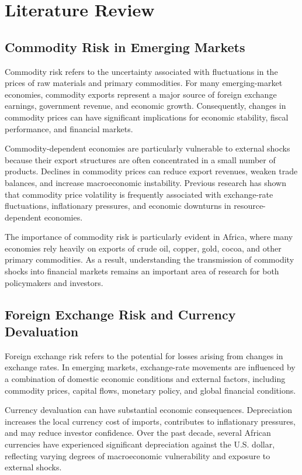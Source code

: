 \documentclass{article}
\begin{document}
\newpage
\section{Literature Review}

\subsection{Commodity Risk in Emerging Markets}

Commodity risk refers to the uncertainty associated with fluctuations in the prices of raw materials and primary commodities. For many emerging-market economies, commodity exports represent a major source of foreign exchange earnings, government revenue, and economic growth. Consequently, changes in commodity prices can have significant implications for economic stability, fiscal performance, and financial markets.

Commodity-dependent economies are particularly vulnerable to external shocks because their export structures are often concentrated in a small number of products. Declines in commodity prices can reduce export revenues, weaken trade balances, and increase macroeconomic instability. Previous research has shown that commodity price volatility is frequently associated with exchange-rate fluctuations, inflationary pressures, and economic downturns in resource-dependent economies.

The importance of commodity risk is particularly evident in Africa, where many economies rely heavily on exports of crude oil, copper, gold, cocoa, and other primary commodities. As a result, understanding the transmission of commodity shocks into financial markets remains an important area of research for both policymakers and investors.

\subsection{Foreign Exchange Risk and Currency Devaluation}

Foreign exchange risk refers to the potential for losses arising from changes in exchange rates. In emerging markets, exchange-rate movements are influenced by a combination of domestic economic conditions and external factors, including commodity prices, capital flows, monetary policy, and global financial conditions.

Currency devaluation can have substantial economic consequences. Depreciation increases the local currency cost of imports, contributes to inflationary pressures, and may reduce investor confidence. Over the past decade, several African currencies have experienced significant depreciation against the U.S. dollar, reflecting varying degrees of macroeconomic vulnerability and exposure to external shocks.
\end{document}
